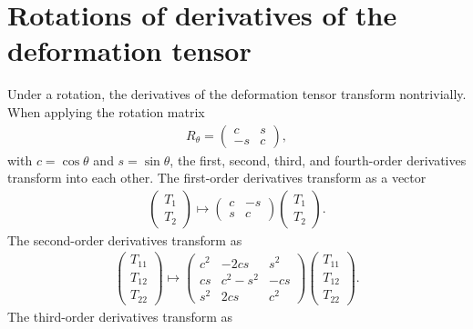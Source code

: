 \documentclass[a4paper, 11pt]{article}
\begin{document}
\section{Rotations of derivatives of the deformation tensor}\label{ap:rotations}
Under a rotation, the derivatives of the deformation tensor transform nontrivially. When applying the rotation matrix
\begin{align}
R_\theta = \begin{pmatrix} c  & s  \\- s  & c \end{pmatrix},
\end{align}
with $c=\cos\theta$ and $s=\sin \theta$, the first, second, third, and fourth-order derivatives transform into each other. The first-order derivatives transform as a vector
\begin{align}
\begin{pmatrix} T_1 \\ T_2 \end{pmatrix}
\mapsto
\begin{pmatrix}
c & -s \\
s &  c 
\end{pmatrix}
\begin{pmatrix} T_1 \\ T_2 \end{pmatrix}.
\end{align}
The second-order derivatives transform as
\begin{align}
\begin{pmatrix} T_{11} \\ T_{12} \\ T_{22} \end{pmatrix}
\mapsto
\begin{pmatrix}
c^2 & -2 c s    &  s^2 \\
c s &  c^2- s^2 & -c s \\
s^2 & 2c s      &  c^2 
\end{pmatrix}
\begin{pmatrix} T_{11} \\ T_{12} \\ T_{22} \end{pmatrix}.
\end{align}
The third-order derivatives transform as
\end{document}
